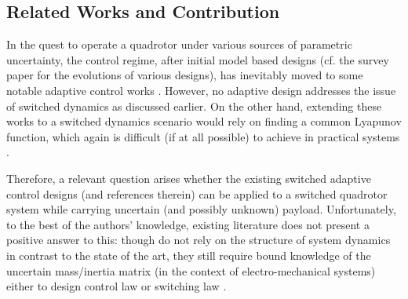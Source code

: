 \documentclass[AMA,STIX1COL,sort, compress]{WileyNJD-v2}
\begin{document}
\subsection{Related Works and Contribution}
In the quest to operate a quadrotor under various sources of parametric uncertainty, the control regime, after initial model based designs (cf. the survey paper \cite{rubisurvey} for the evolutions of various designs), has inevitably moved to some notable adaptive control works \cite{nicol2011robust, bialy2013lyapunov, dydek2012adaptive, ha2014passivity, mofid2018adaptive, tran2018adaptive, tian2019adaptive, zhao2014nonlinear, yang2019energy}. However, no adaptive design addresses the issue of switched dynamics as discussed earlier. On the other hand, extending these works to a switched dynamics scenario would rely on finding a common Lyapunov function, which again is difficult (if at all possible) to achieve in practical systems \cite{lai2018adaptive}. 

Therefore, a relevant question arises whether the existing switched adaptive control designs \cite{lai2018adaptive,yuan2018robust,yuan2017adaptive,lou2018immersion, chen2018global,8362915, 7782779, roy2019reduced, roy2019simultaneous} (and references therein) can be applied to a switched quadrotor system while carrying uncertain (and possibly unknown) payload. Unfortunately, to the best of the authors' knowledge, existing literature does not present a positive answer to this: though \cite{roy2019reduced, roy2019simultaneous} do not rely on the structure of system dynamics in contrast to the state of the art, they still require bound knowledge of the uncertain mass/inertia matrix (in the context of electro-mechanical systems) either to design control law \cite{roy2019simultaneous} or switching law \cite{roy2019reduced}. 
\end{document}
